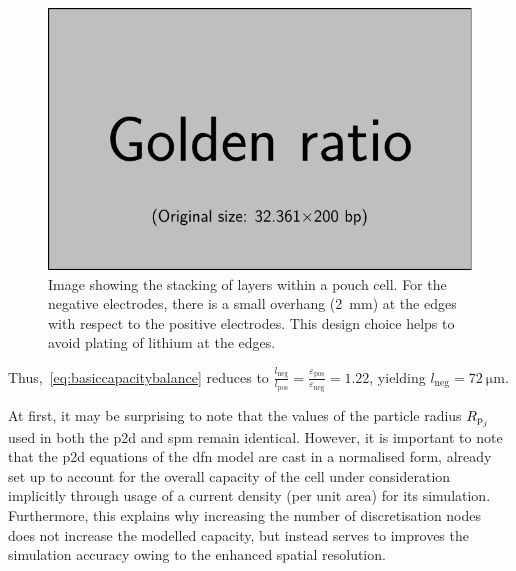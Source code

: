 \begin{figure}[!htb]
    \centering
    \includegraphics{placeholder_images/example-image-golden.pdf}
    \caption[Stacking of layers within a pouch cell]
    {Image showing the stacking of layers within a pouch cell. For the negative
        electrodes, there is a small overhang (\approx\SI{2}{mm}) at the
        edges with respect to the positive electrodes. This design choice
    helps to avoid plating of lithium at the edges.}
    \label{fig:anodeoverhangpouchcell}
\end{figure}

Thus,~\cref{eq:basiccapacitybalance}                                     reduces
to                      $\frac{l_\text{neg}}{l_\text{pos}}                     =
\frac{\varepsilon_\text{pos}}{\varepsilon_\text{neg}}    =    1.22$,    yielding
$l_\text{neg} = \SI{72}{\micro\meter}$.

At first, it  may be surprising to  note that the values of  the particle radius
$R_{{\text{p}_j}}$ used in  both the \gls{p2d} and \gls{spm} remain  identical. However, it
is important  to note that  the \gls{p2d} equations  of the \gls{dfn}  model are
cast in  a normalised  form, \ie{}  already set  up to  account for  the overall
capacity of the  cell under consideration implicitly through usage  of a current
density  (per unit  area) for  its  simulation. Furthermore,  this explains  why
increasing the  number of  discretisation nodes does  not increase  the modelled
capacity, but  instead serves to improves  the simulation accuracy owing  to the
enhanced spatial resolution.

